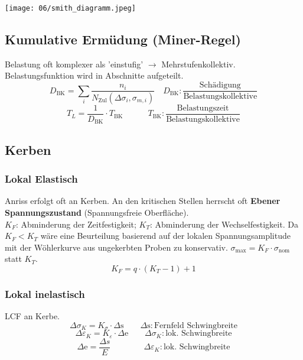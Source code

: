         \texttt{[image: 06/smith\_diagramm.jpeg]}
    \subsection{Kumulative Ermüdung (Miner-Regel)}
        Belastung oft komplexer als 'einstufig' $\rightarrow$ Mehrstufenkollektiv. Belastungsfunktion wird in Abschnitte aufgeteilt.
        \[D_{\textrm{BK}}= \sum_{i}\frac{n_{i}}{N_{\textrm{Zul}}(\Delta\sigma_{i},\sigma_{m,i})} \quad D_{\textrm{BK}}: \frac{\textrm{Schädigung}}{\textrm{Belastungskollektive}} \]
        \[T_{L}=\frac{1}{D_{\textrm{BK}}}\cdot T_{\textrm{BK}} \qquad\quad T_{\textrm{BK}}:\frac{\textrm{Belastungszeit}}{\textrm{Belastungskollektive}}\]
    \subsection{Kerben}
        \subsubsection{Lokal Elastisch}
            Anriss erfolgt oft an Kerben. An den kritischen Stellen herrscht oft \textbf{Ebener Spannungszustand} (Spannungsfreie Oberfläche).\\ $K_F$: Abminderung der Zeitfestigkeit; $K_T$: Abminderung der Wechselfestigkeit. Da $K_F < K_T$ wäre eine Beurteilung basierend auf der lokalen Spannungsamplitude mit der Wöhlerkurve aus ungekerbten Proben zu konservativ. $\sigma_{\textrm{max}}=K_F \cdot \sigma_{\textrm{nom}}$ statt $K_T$.
            \[K_F = q\cdot(K_T-1)+1\]
        \subsubsection{Lokal inelastisch}
            LCF an Kerbe.
            \[\Delta\sigma_K = K_{\sigma} \cdot \Delta\textrm{s} \qquad \Delta\textrm{s}:\textrm{Fernfeld Schwingbreite}\]
            \[\Delta\varepsilon_K = K_{\varepsilon} \cdot \Delta\textrm{e} \qquad \Delta\sigma_K:\textrm{lok. Schwingbreite}\]
            \[\Delta\textrm{e}=\frac{\Delta s}{E} \qquad\qquad \Delta\varepsilon_K:\textrm{lok. Schwingbreite}\]
